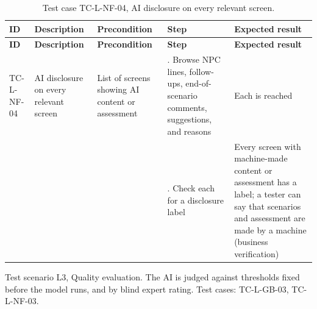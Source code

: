 {\small
\begin{longtable}{|>{\raggedright\arraybackslash}p{}|>{\raggedright\arraybackslash}p{}|>{\raggedright\arraybackslash}p{}|>{\raggedright\arraybackslash}p{}|>{\raggedright\arraybackslash}p{}|}
\caption{Test case TC-L-NF-04, AI disclosure on every relevant screen.} \\
\hline
\textbf{ID} & \textbf{Description} & \textbf{Precondition} & \textbf{Step} & \textbf{Expected result} \\ \hline
\endfirsthead
\hline
\textbf{ID} & \textbf{Description} & \textbf{Precondition} & \textbf{Step} & \textbf{Expected result} \\ \hline
\endhead
TC-L-NF-04 & AI disclosure on every relevant screen & List of screens showing AI content or assessment & 1. Browse NPC lines, follow-ups, end-of-scenario comments, suggestions, and reasons & Each is reached \\ \hline
 &  &  & 2. Check each for a disclosure label & Every screen with machine-made content or assessment has a label; a tester can say that scenarios and assessment are made by a machine (business verification) \\ \hline
\end{longtable}
}

Test scenario L3, Quality evaluation. The AI is judged against thresholds fixed before the model runs, and by blind expert rating. Test cases: TC-L-GB-03, TC-L-NF-03.

